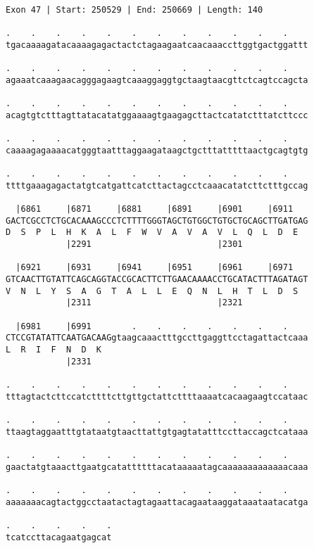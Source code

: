 \documentclass{article}
\begin{document}
\begin{Verbatim}[fontfamily=courier]
Exon 47 | Start: 250529 | End: 250669 | Length: 140

.    .    .    .    .    .    .    .    .    .    .    .    
tgacaaaagatacaaaagagactactctagaagaatcaacaaaccttggtgactggattt

.    .    .    .    .    .    .    .    .    .    .    .    
agaaatcaaagaacagggagaagtcaaaggaggtgctaagtaacgttctcagtccagcta

.    .    .    .    .    .    .    .    .    .    .    .    
acagtgtctttagttatacatatggaaaagtgaagagcttactcatatctttatcttccc

.    .    .    .    .    .    .    .    .    .    .    .    
caaaagagaaaacatgggtaatttaggaagataagctgctttatttttaactgcagtgtg

.    .    .    .    .    .    .    .    .    .    .    .    
ttttgaaagagactatgtcatgattcatcttactagcctcaaacatatcttctttgccag

  |6861     |6871     |6881     |6891     |6901     |6911   
GACTCGCCTCTGCACAAAGCCCTCTTTTGGGTAGCTGTGGCTGTGCTGCAGCTTGATGAG
D  S  P  L  H  K  A  L  F  W  V  A  V  A  V  L  Q  L  D  E  
            |2291                         |2301             

  |6921     |6931     |6941     |6951     |6961     |6971   
GTCAACTTGTATTCAGCAGGTACCGCACTTCTTGAACAAAACCTGCATACTTTAGATAGT
V  N  L  Y  S  A  G  T  A  L  L  E  Q  N  L  H  T  L  D  S  
            |2311                         |2321             

  |6981     |6991        .    .    .    .    .    .    .    
CTCCGTATATTCAATGACAAGgtaagcaaactttgccttgaggttcctagattactcaaa
L  R  I  F  N  D  K                                         
            |2331                                           

.    .    .    .    .    .    .    .    .    .    .    .    
tttagtactcttccatcttttcttgttgctattcttttaaaatcacaagaagtccataac

.    .    .    .    .    .    .    .    .    .    .    .    
ttaagtaggaatttgtataatgtaacttattgtgagtatatttccttaccagctcataaa

.    .    .    .    .    .    .    .    .    .    .    .    
gaactatgtaaacttgaatgcatattttttacataaaaatagcaaaaaaaaaaaaacaaa

.    .    .    .    .    .    .    .    .    .    .    .    
aaaaaaacagtactggcctaatactagtagaattacagaataaggataaataatacatga

.    .    .    .    .
tcatccttacagaatgagcat
\end{Verbatim}
\newpage
\end{document}

